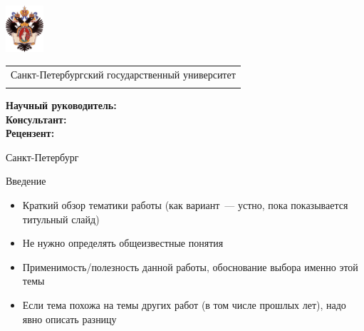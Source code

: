 \documentclass
  [aspectratio=1610] %
  {beamer}
\title[Короткое название]{\my@title@title@ru}
\author[\my@title@author@ru]{\my@title@author@ru, группа \academicGroup}
\institute[СПбГУ]{}
\makeatletter
\newcommand{\advisorChair}{\my@title@chair@ru}
\newcommand{\supervisor}{\my@title@supervisor@ru}
\newcommand{\supervisorPosition}{\my@title@supervisorPosition@ru}
\newcommand{\consultant}{\my@title@consultant@ru}
\newcommand{\consultantPosition}{\my@title@consultantPosition@ru}
\newcommand{\reviewer}{\my@title@reviewer@ru}
\newcommand{\reviewerPosition}{\my@title@reviewerPosition@ru}
\newcommand{\defenseYear}{\my@title@year@ru}
\makeatother
\begin{document}
{
\begin{frame}
    \includegraphics[width=1.4cm]{figures/SPbGU_Logo.png}
    \vspace{-35pt}
    \hspace{-10pt}
    \begin{center}
        \begin{tabular}{c}
            \scriptsize{Санкт-Петербургский государственный университет} \\
            \scriptsize{\advisorChair}
        \end{tabular}
        \titlepage
    \end{center}

    \btVFill

    {\scriptsize
        \textbf{Научный руководитель:}  \supervisorPosition~\supervisor \\
        \textbf{Консультант:}  \consultantPosition~\consultant \\
        \textbf{Рецензент:} \reviewerPosition~\reviewer \\
    }
    \makeatother
    \begin{center}
        \vspace{5pt}
        \scriptsize{Санкт-Петербург\\ \defenseYear}
    \end{center}
\end{frame}
}

\begin{frame}{Введение}
    \begin{itemize}
        \item Краткий обзор тематики работы (как вариант~--- устно, пока показывается титульный слайд)
        \item Не нужно определять общеизвестные понятия
        \item Применимость/полезность данной работы, обоснование выбора именно этой темы
        \item Если тема похожа на темы других работ (в том числе прошлых лет), надо явно описать разницу
    \end{itemize}
\end{frame}
\end{document}
